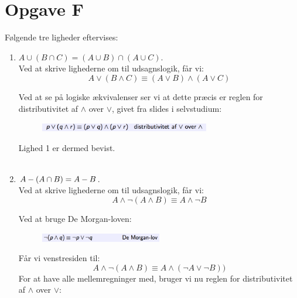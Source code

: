 \section*{Opgave F}

Følgende tre ligheder eftervises:

\begin{enumerate}
    \item $A \cup (B \cap C) = (A \cup B) \cap (A \cup C)$.\\
    
    Ved at skrive lighederne om til udsagnslogik, får vi: 
    \begin{equation*}
        A \vee (B \wedge C) \equiv (A \vee B) \wedge (A \vee C)
    \end{equation*}
    
    Ved at se på logiske ækvivalenser ser vi at dette præcis er reglen for distributivitet af $\wedge$ over $\vee$, givet fra slides i selvstudium:
    
    \begin{figure}[H]
        \centering
        \includegraphics[width=0.7\textwidth]{opgF/WoverV.png}
        \label{fig:WoverV}
    \end{figure}
    
    Lighed 1 er dermed bevist.\\
    \\
    
    \item $A \-- (A \cap B) = A \-- B$. \\
    
    Ved at skrive lighederne om til udsagnslogik, får vi: 
    \begin{equation*}
        A \wedge \neg (A \wedge B) \equiv A \wedge \neg B
    \end{equation*}
    
    Ved at bruge De Morgan-loven: 
    
    \begin{figure}[H]
        \centering
        \includegraphics[width = 0.5\textwidth]{opgF/DML1.png}
        \label{fig:DML1}
    \end{figure}
    
    Får vi venstresiden til:
    \begin{equation*}
        A \wedge \neg (A \wedge B) \equiv A \wedge (\neg A \vee \neg B) )
    \end{equation*}
    For at have alle mellemregninger med, bruger vi nu reglen for distributivitet af $\wedge$ over $\vee$:
    

\end{enumerate}

